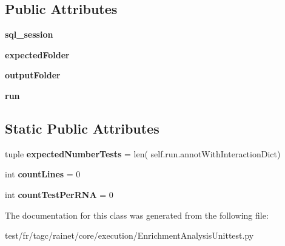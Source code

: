 \subsection*{Public Attributes}
\begin{DoxyCompactItemize}
\item 
\hypertarget{classEnrichmentAnalysisUnittest_1_1EnrichmentAnalysisStrategyUnittest_a4645eebe2adb7fc3e5627d39f189fd53}{{\bfseries sql\-\_\-session}}\label{classEnrichmentAnalysisUnittest_1_1EnrichmentAnalysisStrategyUnittest_a4645eebe2adb7fc3e5627d39f189fd53}

\item 
\hypertarget{classEnrichmentAnalysisUnittest_1_1EnrichmentAnalysisStrategyUnittest_a28a5765ad3523027fa0a5999e3038d45}{{\bfseries expected\-Folder}}\label{classEnrichmentAnalysisUnittest_1_1EnrichmentAnalysisStrategyUnittest_a28a5765ad3523027fa0a5999e3038d45}

\item 
\hypertarget{classEnrichmentAnalysisUnittest_1_1EnrichmentAnalysisStrategyUnittest_ad181adcbad84b7fcefda7d8a52cd02a5}{{\bfseries output\-Folder}}\label{classEnrichmentAnalysisUnittest_1_1EnrichmentAnalysisStrategyUnittest_ad181adcbad84b7fcefda7d8a52cd02a5}

\item 
\hypertarget{classEnrichmentAnalysisUnittest_1_1EnrichmentAnalysisStrategyUnittest_ac69241ee8617cb4bc51818dee988d0c5}{{\bfseries run}}\label{classEnrichmentAnalysisUnittest_1_1EnrichmentAnalysisStrategyUnittest_ac69241ee8617cb4bc51818dee988d0c5}

\end{DoxyCompactItemize}
\subsection*{Static Public Attributes}
\begin{DoxyCompactItemize}
\item 
\hypertarget{classEnrichmentAnalysisUnittest_1_1EnrichmentAnalysisStrategyUnittest_aca3d4e3b0cdb3c2485cd79525310a035}{tuple {\bfseries expected\-Number\-Tests} = len( self.\-run.\-annot\-With\-Interaction\-Dict)}\label{classEnrichmentAnalysisUnittest_1_1EnrichmentAnalysisStrategyUnittest_aca3d4e3b0cdb3c2485cd79525310a035}

\item 
\hypertarget{classEnrichmentAnalysisUnittest_1_1EnrichmentAnalysisStrategyUnittest_ad54ac92c0684f061c282f65f0d32e392}{int {\bfseries count\-Lines} = 0}\label{classEnrichmentAnalysisUnittest_1_1EnrichmentAnalysisStrategyUnittest_ad54ac92c0684f061c282f65f0d32e392}

\item 
\hypertarget{classEnrichmentAnalysisUnittest_1_1EnrichmentAnalysisStrategyUnittest_a9449476f7b177676715447447f43c148}{int {\bfseries count\-Test\-Per\-R\-N\-A} = 0}\label{classEnrichmentAnalysisUnittest_1_1EnrichmentAnalysisStrategyUnittest_a9449476f7b177676715447447f43c148}

\end{DoxyCompactItemize}


The documentation for this class was generated from the following file\-:\begin{DoxyCompactItemize}
\item 
test/fr/tagc/rainet/core/execution/Enrichment\-Analysis\-Unittest.\-py\end{DoxyCompactItemize}
